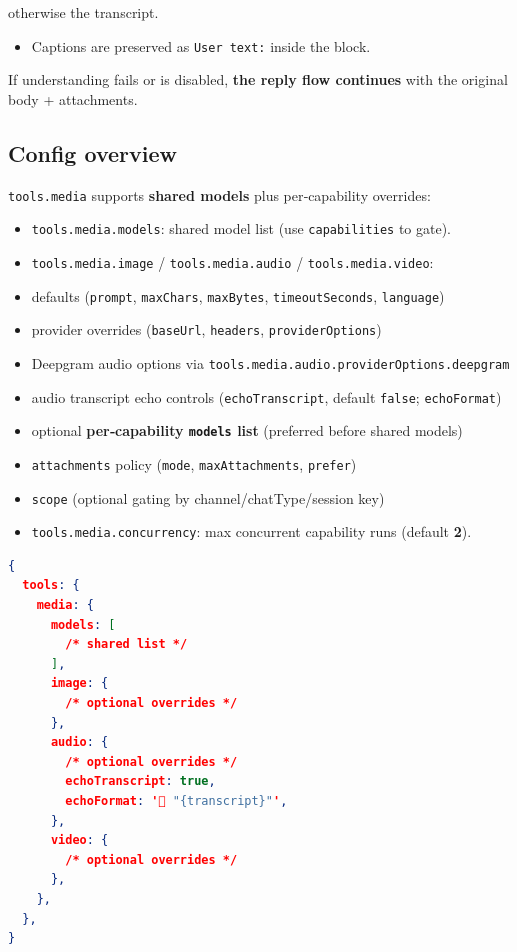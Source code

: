 otherwise the transcript.
\begin{itemize}
  \item Captions are preserved as \texttt{User text:} inside the block.
\end{itemize}


If understanding fails or is disabled, \textbf{the reply flow continues} with the original body + attachments.

\subsection{Config overview}


\texttt{tools.media} supports \textbf{shared models} plus per‑capability overrides:

\begin{itemize}
  \item \texttt{tools.media.models}: shared model list (use \texttt{capabilities} to gate).
  \item \texttt{tools.media.image} / \texttt{tools.media.audio} / \texttt{tools.media.video}:
  \item defaults (\texttt{prompt}, \texttt{maxChars}, \texttt{maxBytes}, \texttt{timeoutSeconds}, \texttt{language})
  \item provider overrides (\texttt{baseUrl}, \texttt{headers}, \texttt{providerOptions})
  \item Deepgram audio options via \texttt{tools.media.audio.providerOptions.deepgram}
  \item audio transcript echo controls (\texttt{echoTranscript}, default \texttt{false}; \texttt{echoFormat})
  \item optional \textbf{per‑capability \texttt{models} list} (preferred before shared models)
  \item \texttt{attachments} policy (\texttt{mode}, \texttt{maxAttachments}, \texttt{prefer})
  \item \texttt{scope} (optional gating by channel/chatType/session key)
  \item \texttt{tools.media.concurrency}: max concurrent capability runs (default \textbf{2}).
\end{itemize}


\begin{lstlisting}[language=json]
{
  tools: {
    media: {
      models: [
        /* shared list */
      ],
      image: {
        /* optional overrides */
      },
      audio: {
        /* optional overrides */
        echoTranscript: true,
        echoFormat: '📝 "{transcript}"',
      },
      video: {
        /* optional overrides */
      },
    },
  },
}
\end{lstlisting}


